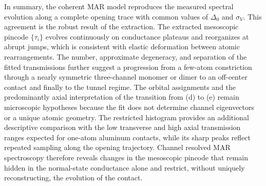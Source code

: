         In summary, the coherent MAR model reproduces the measured spectral evolution along a complete opening trace with common values of $\Delta_0$ and $\sigma_V$. This agreement is the robust result of the extraction. The extracted mesoscopic pincode $\{\tau_i\}$ evolves continuously on conductance plateaus and reorganizes at abrupt jumps, which is consistent with elastic deformation between atomic rearrangements. The number, approximate degeneracy, and separation of the fitted transmissions further suggest a progression from a few-atom constriction through a nearly symmetric three-channel monomer or dimer to an off-center contact and finally to the tunnel regime. The orbital assignments and the predominantly axial interpretation of the transition from (d) to (e) remain microscopic hypotheses because the fit does not determine channel eigenvectors or a unique atomic geometry. The restricted histogram provides an additional descriptive comparison with the low transverse and high axial transmission ranges expected for one-atom aluminum contacts, while its sharp peaks reflect repeated sampling along the opening trajectory. Channel resolved MAR spectroscopy therefore reveals changes in the mesoscopic pincode that remain hidden in the normal-state conductance alone and restrict, without uniquely reconstructing, the evolution of the contact.
